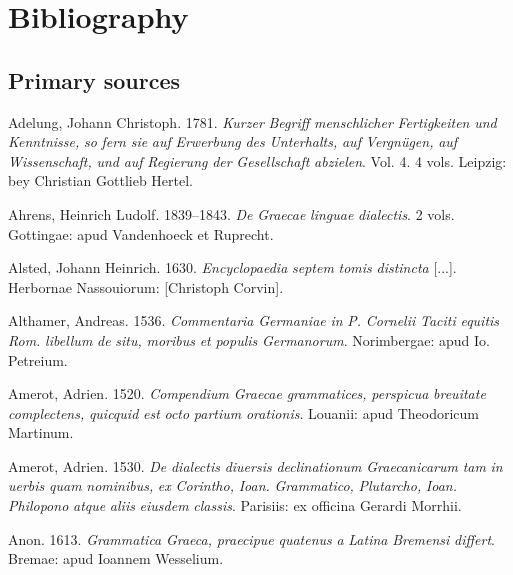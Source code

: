 \documentclass[output=paper]{langsci/langscibook}
\begin{document}
\section{Bibliography}
\hypertarget{Toc19704870}{}\subsection{Primary sources}
\hypertarget{Toc19704871}{}
Adelung, Johann Christoph. 1781. \textit{Kurzer} \textit{Begriff} \textit{menschlicher} \textit{Fertigkeiten} \textit{und} \textit{Kenntnisse,} \textit{so} \textit{fern} \textit{sie} \textit{auf} \textit{Erwerbung} \textit{des} \textit{Unterhalts,} \textit{auf} \textit{Vergnügen,} \textit{auf} \textit{Wissenschaft,} \textit{und} \textit{auf} \textit{Regierung} \textit{der} \textit{Gesellschaft} \textit{abzielen}. Vol. 4. 4 vols. Leipzig: bey Christian Gottlieb Hertel.

Ahrens, Heinrich Ludolf. 1839–1843. \textit{De} \textit{Graecae} \textit{linguae} \textit{dialectis}. 2 vols. Gottingae: apud Vandenhoeck et Ruprecht.

Alsted, Johann Heinrich. 1630. \textit{Encyclopaedia} \textit{septem} \textit{tomis} \textit{distincta} [...]. Herbornae Nassouiorum: [Christoph Corvin].

Althamer, Andreas. 1536. \textit{Commentaria} \textit{Germaniae} \textit{in} \textit{P.} \textit{Cornelii} \textit{Taciti} \textit{equitis} \textit{Rom.} \textit{libellum} \textit{de} \textit{situ,} \textit{moribus} \textit{et} \textit{populis} \textit{Germanorum}. Norimbergae: apud Io. Petreium.

Amerot, Adrien. 1520. \textit{Compendium} \textit{Graecae} \textit{grammatices,} \textit{perspicua} \textit{breuitate} \textit{complectens,} \textit{quicquid} \textit{est} \textit{octo} \textit{partium} \textit{orationis}. Louanii: apud Theodoricum Martinum.

Amerot, Adrien. 1530. \textit{De} \textit{dialectis} \textit{diuersis} \textit{declinationum} \textit{Graecanicarum} \textit{tam} \textit{in} \textit{uerbis} \textit{quam} \textit{nominibus,} \textit{ex} \textit{Corintho,} \textit{Ioan.} \textit{Grammatico,} \textit{Plutarcho,} \textit{Ioan.} \textit{Philopono} \textit{atque} \textit{aliis} \textit{eiusdem} \textit{classis}. Parisiis: ex officina Gerardi Morrhii.

Anon. 1613. \textit{Grammatica} \textit{Graeca,} \textit{praecipue} \textit{quatenus} \textit{a} \textit{Latina} \textit{Bremensi} \textit{differt}. Bremae: apud Ioannem Wesselium.
\end{document}
